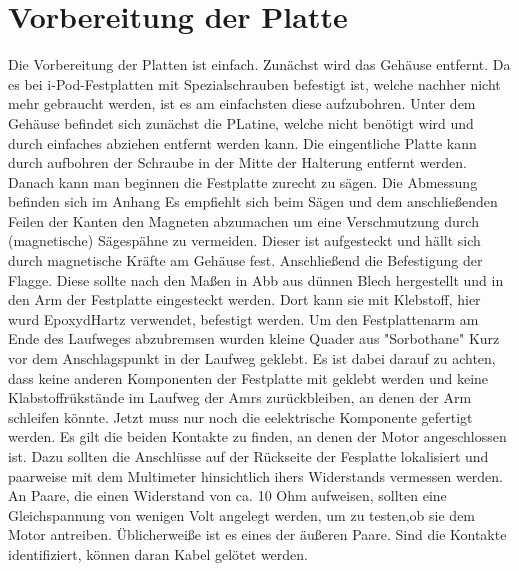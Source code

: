 \section{Vorbereitung der Platte}
Die Vorbereitung der Platten ist einfach. Zunächst wird das Gehäuse entfernt. Da es bei i-Pod-Festplatten mit Spezialschrauben befestigt ist, welche nachher nicht mehr gebraucht werden, ist es am einfachsten diese aufzubohren. Unter dem Gehäuse befindet sich zunächst die PLatine, welche nicht benötigt wird und durch einfaches abziehen entfernt werden kann. Die eingentliche Platte kann durch aufbohren der Schraube in der Mitte der Halterung entfernt werden. Danach kann man beginnen die Festplatte zurecht zu sägen. Die Abmessung befinden sich im Anhang %
Es empfiehlt sich beim Sägen und dem anschließenden Feilen der Kanten den Magneten abzumachen um eine Verschmutzung durch (magnetische) Sägespähne zu vermeiden. Dieser ist aufgesteckt und hällt sich durch magnetische Kräfte am Gehäuse fest. 
Anschließend die Befestigung der Flagge. Diese sollte nach den Maßen in Abb %
aus dünnen Blech hergestellt und in den Arm der Festplatte eingesteckt werden. Dort kann sie mit Klebstoff, hier wurd EpoxydHartz verwendet, befestigt werden.
Um den Festplattenarm am Ende des Laufweges abzubremsen wurden kleine Quader aus "Sorbothane" %
Kurz vor dem Anschlagspunkt in der Laufweg geklebt. Es ist dabei darauf zu achten, dass keine anderen Komponenten der Festplatte mit geklebt werden und keine Klabstoffrükstände im Laufweg der Amrs zurückbleiben, an denen der Arm schleifen könnte.
Jetzt muss nur noch die eelektrische Komponente gefertigt werden. Es gilt die beiden Kontakte zu finden, an denen der Motor angeschlossen ist. Dazu sollten die Anschlüsse auf der Rückseite der Fesplatte lokalisiert und paarweise mit dem Multimeter hinsichtlich ihers Widerstands vermessen werden. An Paare, die einen Widerstand von ca. 10 Ohm aufweisen, sollten eine Gleichspannung von wenigen Volt angelegt werden, um zu testen,ob sie dem Motor antreiben. Üblicherweiße ist es eines der äußeren Paare. Sind die Kontakte identifiziert, können daran Kabel gelötet werden. 